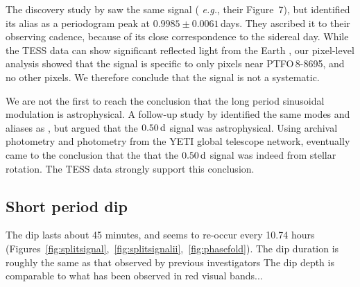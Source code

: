 \documentclass[12pt,twocolumn,tighten]{aastex62}
\newcommand{\ptfo}{PTFO$\,$8-8695}
\begin{document}
The discovery study by \citet{van_eyken_ptf_2012} saw the same signal ({\it
e.g.}, their Figure~7), but identified its alias as a periodogram peak at
$0.9985 \pm 0.0061\,$days. They ascribed it to their observing cadence, because
of its close correspondence to the sidereal day.  While the TESS data can show
significant reflected light from the Earth \citep[{\it
e.g.},][]{luger_tess_2019}, our pixel-level analysis showed that the signal is
specific to only pixels near \ptfo, and no other pixels.  We therefore conclude
that the signal is not a systematic.

We are not the first to reach the conclusion that the long period sinusoidal
modulation is astrophysical.  A follow-up study by
\citet{koen_multicolour_2015} identified the same modes and aliases as
\citet{van_eyken_ptf_2012}, but argued that the $0.50\,{\rm d}$ signal was
astrophysical.  Using archival photometry and photometry from the YETI global
telescope network, \citet{raetz_yeti_2016} eventually came to the conclusion
that the that the $0.50\,{\rm d}$ signal was indeed from stellar rotation.  The
TESS data strongly support this conclusion.



\subsection{Short period dip}
The dip lasts about 45 minutes, and seems to re-occur every 10.74
hours
(Figures~\ref{fig:splitsignal},~\ref{fig:splitsignalii},~\ref{fig:phasefold}).
The dip duration is roughly the same as that observed by previous
investigators \citep{van_eyken_ptf_2012,yu_tests_2015}
The dip depth is comparable to what has been observed in red visual
bands...
\end{document}
